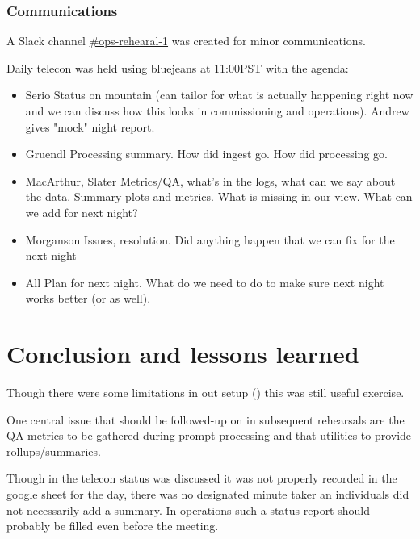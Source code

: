 \subsubsection{Communications }


A Slack channel \href{https://lsstc.slack.com/messages/CJBSY6FUN}{\#ops-rehearal-1}  was created
for minor communications.

Daily telecon was held using bluejeans at 11:00PST with the agenda:
\begin{itemize}
\item Serio	Status on mountain (can tailor for what is actually happening right now and we can discuss how this looks in commissioning and operations). Andrew gives "mock" night report.
\item Gruendl 	Processing summary. How did ingest go. How did processing go.
\item MacArthur, Slater	Metrics/QA, what's in the logs, what can we say about the data. Summary plots and metrics. What is missing in our view. What can we add for next night?
\item Morganson	Issues, resolution. Did anything happen that we can fix for the next night

\item All	Plan for next night. What do we need to do to make sure next night works better (or as well).
\end{itemize}







\section{Conclusion and lessons learned}\label{sec:conc}
Though there were some limitations in out setup () this was still useful exercise.

One central issue that should be followed-up on in subsequent rehearsals are the \gls{QA} metrics to be gathered during prompt processing and that utilities to provide rollups/summaries.

Though in the telecon status was discussed it was not properly recorded in the google sheet for the day,
there was no designated minute taker an individuals did not necessarily add a summary. In operations such a status
report should probably be filled even before the meeting.



